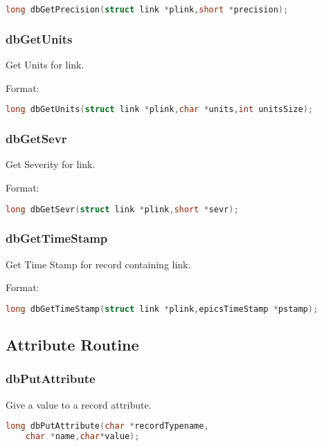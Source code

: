 \begin{lstlisting}[language=C]
long dbGetPrecision(struct link *plink,short *precision);
\end{lstlisting}

\subsubsection{dbGetUnits}

Get Units for link.

Format:

\begin{lstlisting}[language=C]
long dbGetUnits(struct link *plink,char *units,int unitsSize);
\end{lstlisting}

\subsubsection{dbGetSevr}

Get Severity for link.

Format:

\begin{lstlisting}[language=C]
long dbGetSevr(struct link *plink,short *sevr);
\end{lstlisting}

\subsubsection{dbGetTimeStamp}

Get Time Stamp for record containing link.

Format:

\begin{lstlisting}[language=C]
long dbGetTimeStamp(struct link *plink,epicsTimeStamp *pstamp);
\end{lstlisting}

\subsection{Attribute Routine}

\subsubsection{dbPutAttribute}

Give a value to a record attribute.

\begin{lstlisting}[language=C]
long dbPutAttribute(char *recordTypename,
    char *name,char*value);
\end{lstlisting}

